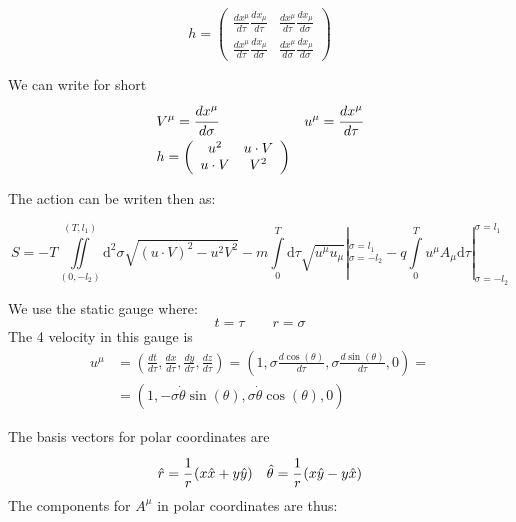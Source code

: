 \documentclass[11pt,a4paper]{article}
\begin{document}
\begin{equation*}
h=
\begin{pmatrix}
\frac{dx^{\mu}}{d\tau}\frac{dx_{\mu}}{d\tau} & \frac{dx^{\mu}}{d\tau}\frac{dx_{\mu}}{d\sigma}\\
\frac{dx^{\mu}}{d\tau}\frac{dx_{\mu}}{d\sigma} & \frac{dx^{\mu}}{d\sigma}\frac{dx_{\mu}}{d\sigma}\end{pmatrix}
\end{equation*} 

We can write for short \begin{align*}
&V^{\mu}=\cfrac{dx^{\mu}}{d\sigma} & u^{\mu}=\cfrac{dx^{\mu}}{d\tau} \\
&h=\left(\begin{array}{cc} u^{2} & u\cdot V\\ u\cdot V & V^{2} \end{array}\right)
\end{align*} 

The action can be writen then as:

\begin{equation}
S=-T\iint\limits_{(0,-l_{2})}^{(T,l_{1})}\mathrm{d}^{2}\sigma\sqrt{\left(u\cdot V\right)^{2}-u^{2}V^{2}}-m\int\limits_{0}^{T}\mathrm{d}\tau\sqrt{u^{\mu}u_{\mu}}|_{\sigma=-l_{2}}^{\sigma=l_{1}}-q\int\limits_{0}^{T}u^{\mu}A_{\mu}\mathrm{d}\tau|_{\sigma=-l_{2}}^{\sigma=l_{1}} 
\end{equation}
 
We use the static gauge where:
\begin{equation}
\label{eq:staticqauge}
t=\tau \qquad r=\sigma
\end{equation}
The 4 velocity in this gauge is
\begin{align*}
u^{\mu}&=\left(\frac{dt}{d\tau},\frac{dx}{d\tau},\frac{dy}{d\tau},\frac{dz}{d\tau}\right)
=\left(1,\sigma\frac{d\cos\left(\theta\right)}{d\tau},\sigma\frac{d\sin\left(\theta\right)}{d\tau},0\right)=\\
&=\left(1,-\sigma\dot{\theta}\sin\left(\theta\right),\sigma\dot{\theta}\cos\left(\theta\right),0\right)
\end{align*}

The basis vectors for polar coordinates are
\begin{align*}
&\hat{r}=\cfrac{1}{r}\left(x\hat{x}+y\hat{y}\right) & \hat{\theta}=\cfrac{1}{r}\left(x\hat{y}-y\hat{x}\right)
\end{align*}
The components for $ A^{\mu} $ in polar coordinates are thus:
\end{document}
